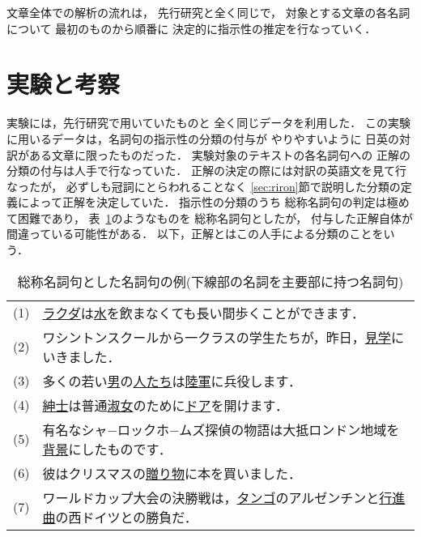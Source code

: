 文章全体での解析の流れは，
先行研究と全く同じで，
対象とする文章の各名詞について
最初のものから順番に
決定的に指示性の推定を行なっていく．

\section{実験と考察}\label{sec:jikken}



実験には，先行研究で用いていたものと
全く同じデータを利用した．
この実験に用いるデータは，名詞句の指示性の分類の付与が
やりやすいように
日英の対訳がある文章に限ったものだった．
実験対象のテキストの各名詞句への
正解の分類の付与は人手で行なっていた．
正解の決定の際には対訳の英語文を見て行なったが，
必ずしも冠詞にとらわれることなく
\ref{sec:riron}節で説明した分類の定義によって正解を決定していた．
指示性の分類のうち
総称名詞句の判定は極めて困難であり，
表~\ref{fig:sousyou}のようなものを
総称名詞句としたが，
付与した正解自体が間違っている可能性がある．
以下，正解とはこの人手による分類のことをいう．

\begin{table}[t]
\small

\caption{総称名詞句とした名詞句の例(下線部の名詞を主要部に持つ名詞句)}\label{fig:sousyou}

{
  \begin{center}

\begin{tabular}{|c@{ }p{7.4cm}|} \hline

(1)&\underline{ラクダ}は\underline{水}を飲まなくても長い間歩くことができます．\\ 

(2)&ワシントンスクールから一クラスの学生たちが，昨日，\underline{見学}にいきました．\\ 

(3)&多くの若い\underline{男}の\underline{人たち}は\underline{陸軍}に兵役します．\\ 

(4)&\underline{紳士}は普通\underline{淑女}のために\underline{ドア}を開けます．\\ 

(5)&有名なシャ−ロックホ−ムズ探偵の物語は大抵ロンドン地域を\underline{背景}にしたものです．\\ 

(6)&彼はクリスマスの\underline{贈り物}に本を買いました．\\ 

(7)&ワールドカップ大会の決勝戦は，\underline{タンゴ}のアルゼンチンと\underline{行進曲}の西ドイツとの勝負だ．\\[0.1cm] \hline
\end{tabular}
    
  \end{center}
}

\end{table}


